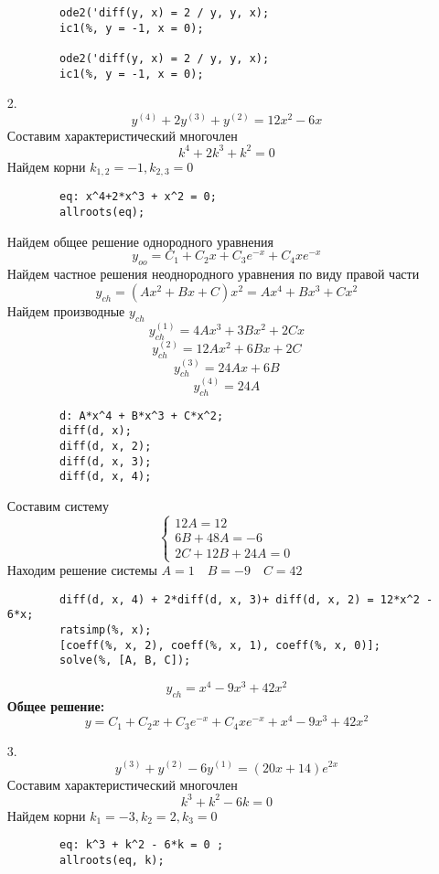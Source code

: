 \documentclass[a4paper, 12pt, oneside]{scrartcl}
\begin{document}
\begin{enumerate}
\begin{verbatim}
		ode2('diff(y, x) = 2 / y, y, x);
		ic1(%, y = -1, x = 0);
		
		ode2('diff(y, x) = 2 / y, y, x);
		ic1(%, y = -1, x = 0);
		\end{verbatim} 
		
		\item[2.]
		$$ y^{(4)} + 2y^{(3)} + y^{(2)} = 12x^2 - 6x $$
		Составим характеристический многочлен \\
		$$ k^{4} + 2k^{3} + k^{2} = 0 $$
		Найдем корни $ k_{1, 2} = {-1}, k_{2, 3} = {0} $ \\
		\begin{verbatim}
		eq: x^4+2*x^3 + x^2 = 0; 
		allroots(eq);
		\end{verbatim} 

		Найдем общее решение однородного уравнения \\
		$$ y_{oo} = C_{1} + C_{2}x + C_{3}e^{-x} + C_{4}xe^{-x} $$
		Найдем частное решения неоднородного уравнения по виду правой части \\
		$$ y_{ch} = (Ax^2 + Bx + C)x^2 = Ax^4 + Bx^3 + Cx^2 $$
		Найдем производные $ y_{ch} $
		$$ y_{ch}^{(1)} = 4Ax^3 + 3Bx^2 + 2Cx  $$
		$$ y_{ch}^{(2)} = 12Ax^2 + 6Bx + 2C  $$
		$$ y_{ch}^{(3)} = 24Ax + 6B  $$
		$$ y_{ch}^{(4)} = 24A$$
		\begin{verbatim}
		d: A*x^4 + B*x^3 + C*x^2;
		diff(d, x);
		diff(d, x, 2);
		diff(d, x, 3);
		diff(d, x, 4);
		\end{verbatim} 
		
		Составим систему \\
		\begin{equation*}
		  \begin{cases}
   			12A = 12 \\
   			6B + 48A = -6 \\
   			2C + 12B + 24A = 0
		  \end{cases}
		\end{equation*}
		Находим решение системы $ A = 1 \quad B = -9 \quad C = 42 $ \\
		\begin{verbatim}
		diff(d, x, 4) + 2*diff(d, x, 3)+ diff(d, x, 2) = 12*x^2 - 6*x;
		ratsimp(%, x);
		[coeff(%, x, 2), coeff(%, x, 1), coeff(%, x, 0)];
		solve(%, [A, B, C]);
		\end{verbatim} 

		$$ y_{ch} = x^4 - 9x^3 + 42x^2 $$
		\textbf{Общее решение: }
		$$ y = C_{1} + C_{2}x + C_{3}e^{-x} + C_{4}xe^{-x} +  x^4 -9x^3 + 42x^2$$

		\item[3.]
		$$ y^{(3)} + y^{(2)} - 6y^{(1)} = (20x + 14)e^{2x} $$
		Составим характеристический многочлен \\
		$$ k^{3} + k^{2} - 6k = 0 $$
		Найдем корни $ k_{1} = -3, k_{2} = 2, k_{3} = 0 $ \\
		\begin{verbatim}
		eq: k^3 + k^2 - 6*k = 0 ; 
		allroots(eq, k);
		\end{verbatim} 


\end{enumerate}
\end{document}
